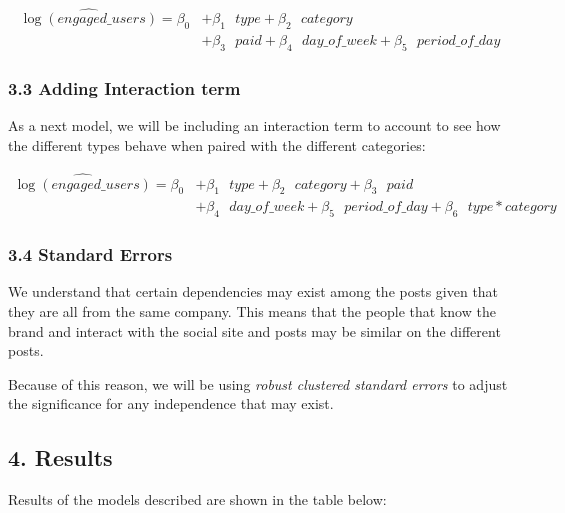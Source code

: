 \documentclass[
]{article}
\begin{document}
\begin{align*}
\widehat{\log(engaged\_users)}=\beta_0 &+ \beta_1 \text{ } type + \beta_2 \text{ } category\\ 
&+ \beta_3 \text{ } paid +\beta_4 \text{ } day\_of\_week + \beta_5 \text{ } period\_of\_day
\end{align*}

\hypertarget{adding-interaction-term}{%
\subsubsection{3.3 Adding Interaction
term}\label{adding-interaction-term}}

As a next model, we will be including an interaction term to account to
see how the different types behave when paired with the different
categories:

\begin{align*}
\widehat{\log(engaged\_users)}=\beta_0 &+ \beta_1 \text{ } type + \beta_2 \text{ } category + \beta_3 \text{ } paid \\
& + \beta_4 \text{ } day\_of\_week + \beta_5 \text{ } period\_of\_day + \beta_6 \text{ } type*category
\end{align*}

\hypertarget{standard-errors}{%
\subsubsection{3.4 Standard Errors}\label{standard-errors}}

We understand that certain dependencies may exist among the posts given
that they are all from the same company. This means that the people that
know the brand and interact with the social site and posts may be
similar on the different posts.

Because of this reason, we will be using \emph{robust clustered standard
errors} to adjust the significance for any independence that may exist.

\hypertarget{results}{%
\subsection{4. Results}\label{results}}

Results of the models described are shown in the table below:
\end{document}
